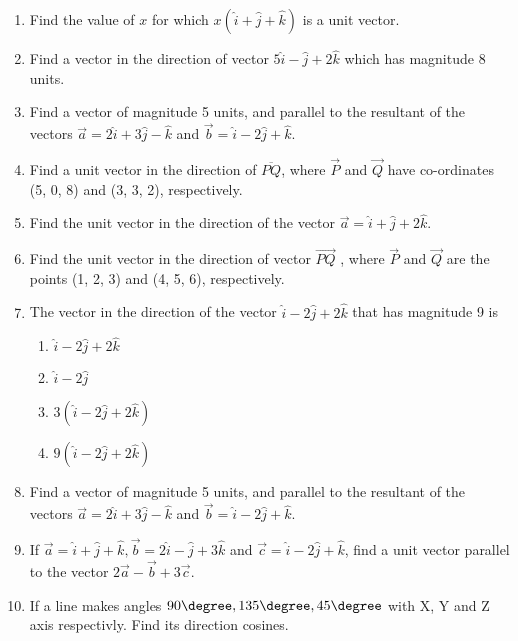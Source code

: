 \begin{enumerate}[label=\thesubsection.\arabic*, ref=\thesubsection.\theenumi]
\item Find the value of $x$ for which $x(\hat{i}+\hat{j}+\hat{k})$ is a unit vector.\\
	\solution
		
\item Find a vector in the direction of vector $5\hat{i}-\hat{j}+2\hat{k}$ which has magnitude 8 units.
        \label{prob:12/10/2/10const}
   \\ 
    \solution 
		
	\item 
Find a vector of magnitude 5 units,  and parallel to the resultant of the vectors $\vec{a} = 2\hat{i}+3\hat{j}-\hat{k}$ and $\vec{b} = \hat{i}-2\hat{j}+\hat{k}$.
\\
\solution
		
\item Find a unit vector in the direction of $\overline{PQ} $,  where $\vec{P}$ and $\vec{Q}$ have co-ordinates (5, 0, 8) and (3, 3, 2), respectively.
\item Find the unit vector in the direction of the vector $\vec{a}=\hat{i}+\hat{j}+2\hat{k}$.
\item Find the unit vector in the direction of vector $\overrightarrow{PQ}$ ,  where $\vec{P}$ and $\vec{Q}$ are the points
(1,  2,  3) and (4,  5,  6),  respectively.
\item The vector in the direction of the vector $\hat{i}-2\hat{j}+2\hat{k}$ that has magnitude 9 is
	\begin{enumerate}
\item $\hat{i}-2\hat{j}+2\hat{k}$
\item $\hat{i}-2\hat{j}$
\item $3(\hat{i}-2\hat{j}+2\hat{k})$
\item $9(\hat{i}-2\hat{j}+2\hat{k})$
\end{enumerate}
\item Find a vector of magnitude 5 units,  and parallel to the resultant of the vectors $\vec{a}=2\hat{i}+3\hat{j}-\hat{k}$ and $\vec{b}=\hat{i}-2\hat{j}+\hat{k}$.\\
\item If $\vec{a}=\hat{i}+\hat{j}+\hat{k},  \vec{b}=2\hat{i}-\hat{j}+3\hat{k}$ and $\vec{c}=\hat{i}-2\hat{j}+\hat{k}$,  find a unit vector parallel to the vector $2\vec{a}-\vec{b}+3\vec{c}$.\\
	\solution
		
	\item If a line makes angles $90\degree, 135\degree, 45\degree$ with X, Y and Z axis respectivly. Find its direction cosines.

\end{enumerate}
